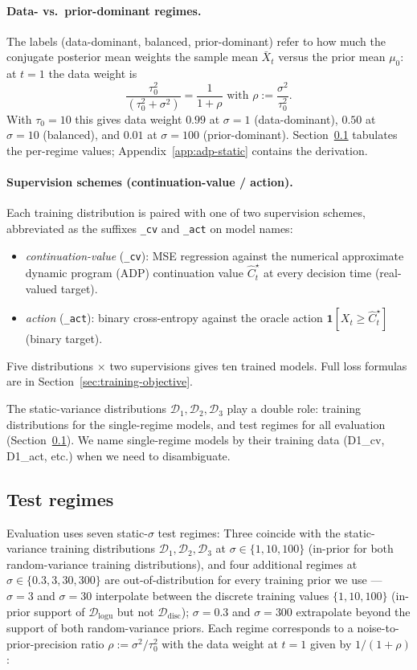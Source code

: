 \documentclass[11pt]{article}
\begin{document}
\paragraph{Data- vs.\ prior-dominant regimes.} The labels (data-dominant, balanced, prior-dominant) refer to how much the conjugate posterior mean weights the sample mean $\bar X_t$ versus the prior mean $\mu_0$: at $t = 1$ the data weight is $$\frac{\tau_0^2}{(\tau_0^2 + \sigma^2)} = \frac{1}{1 + \rho} \text{ with } \rho := \frac{\sigma^2}{\tau_0^2}.$$ With $\tau_0 = 10$ this gives data weight $0.99$ at $\sigma = 1$ (data-dominant), $0.50$ at $\sigma = 10$ (balanced), and $0.01$ at $\sigma = 100$ (prior-dominant). Section~\ref{sec:regimes} tabulates the per-regime values; Appendix~\ref{app:adp-static} contains the derivation.

\paragraph{Supervision schemes (continuation-value / action).} Each training distribution is paired with one of two supervision schemes, abbreviated as the suffixes \texttt{\_cv} and \texttt{\_act} on model names:
\begin{itemize}
\item \emph{continuation-value} (\texttt{\_cv}): MSE regression against the numerical approximate dynamic program (ADP) continuation value $\widehat C_t^\star$ at every decision time (real-valued target).
\item \emph{action} (\texttt{\_act}): binary cross-entropy against the oracle action $\mathbf{1}[X_t \ge \widehat C_t^\star]$ (binary target).
\end{itemize}
Five distributions $\times$ two supervisions gives ten trained models. Full loss formulas are in Section~\ref{sec:training-objective}.

The static-variance distributions $\mathcal{D}_1, \mathcal{D}_2, \mathcal{D}_3$ play a double role: training distributions for the single-regime models, and test regimes for all evaluation (Section~\ref{sec:regimes}). We name single-regime models by their training data (D1\_cv, D1\_act, etc.) when we need to disambiguate.

\subsection{Test regimes}
\label{sec:regimes}

Evaluation uses seven static-$\sigma$ test regimes: Three coincide with the static-variance training distributions $\mathcal{D}_1, \mathcal{D}_2, \mathcal{D}_3$ at $\sigma \in \{1, 10, 100\}$ (in-prior for both random-variance training distributions), and four additional regimes at $\sigma \in \{0.3, 3, 30, 300\}$ are out-of-distribution for every training prior we use --- $\sigma = 3$ and $\sigma = 30$ interpolate between the discrete training values $\{1, 10, 100\}$ (in-prior support of $\mathcal{D}_{\mathrm{logu}}$ but not $\mathcal{D}_{\mathrm{disc}}$); $\sigma = 0.3$ and $\sigma = 300$ extrapolate beyond the support of both random-variance priors. Each regime corresponds to a noise-to-prior-precision ratio $\rho := \sigma^2/\tau_0^2$ with the data weight at $t = 1$ given by $1/(1 + \rho)$:
\end{document}
